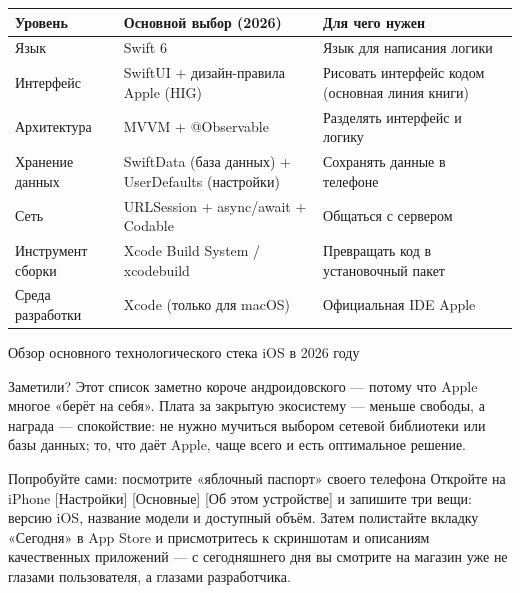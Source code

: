 
\begin{center}
\begin{tabularx}{\linewidth}{|X|X|X|}
\hline
\textbf{Уровень} & \textbf{Основной выбор (2026)} & \textbf{Для чего нужен} \tabularnewline
\hline
Язык & Swift 6 & Язык для написания логики \tabularnewline
Интерфейс & SwiftUI + дизайн-правила Apple (HIG) & Рисовать интерфейс кодом (основная линия книги) \tabularnewline
Архитектура & MVVM + @Observable & Разделять интерфейс и логику \tabularnewline
Хранение данных & SwiftData (база данных) + UserDefaults (настройки) & Сохранять данные в телефоне \tabularnewline
Сеть & URLSession + async/await + Codable & Общаться с сервером \tabularnewline
Инструмент сборки & Xcode Build System / xcodebuild & Превращать код в установочный пакет \tabularnewline
Среда разработки & Xcode (только для macOS) & Официальная IDE Apple \tabularnewline
\hline
\end{tabularx}
\end{center}

\begin{center}\small\color{gray}Обзор основного технологического стека iOS в 2026 году\end{center}

Заметили? Этот список заметно короче андроидовского — потому что Apple многое «берёт на себя». Плата за закрытую экосистему — меньше свободы, а награда — спокойствие: не нужно мучиться выбором сетевой библиотеки или базы данных; то, что даёт Apple, чаще всего и есть оптимальное решение.

\begin{tcbpractice}{Попробуйте сами: посмотрите «яблочный паспорт» своего телефона}
Откройте на iPhone [Настройки] [Основные] [Об этом устройстве] и запишите три вещи: версию iOS, название модели и доступный объём. Затем полистайте вкладку «Сегодня» в App Store и присмотритесь к скриншотам и описаниям качественных приложений — с сегодняшнего дня вы смотрите на магазин уже не глазами пользователя, а глазами разработчика.

\end{tcbpractice}

